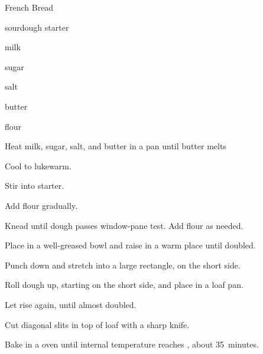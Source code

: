 \begin{recipe}{French Bread}{}{}

\begin{ingredients}
\item {} sourdough starter
\item \C{\half} milk
\item \Tp{1\eighth} sugar
\item \tp{2\quarter} salt
\item \C{\eighth} butter 
\item \C{1\twothird} flour
\end{ingredients}

\begin{directions}

\item Heat milk, sugar, salt, and butter in a pan until butter melts
\item Cool to lukewarm.

\item Stir into starter.
\item Add flour gradually.

\item Knead until dough passes window-pane test. Add flour as needed.

\item Place in a well-greased bowl and raise in a warm place until doubled.

\item Punch down and stretch into a large rectangle,  on the short side.

\item Roll dough up, starting on the short side, and place in a loaf pan.

\item Let rise again, until almost doubled.

\item Cut diagonal slits in top of loaf with a sharp knife.

\item Bake in a  oven until internal temperature reaches , about 35~minutes.

\end{directions}
\end{recipe}
